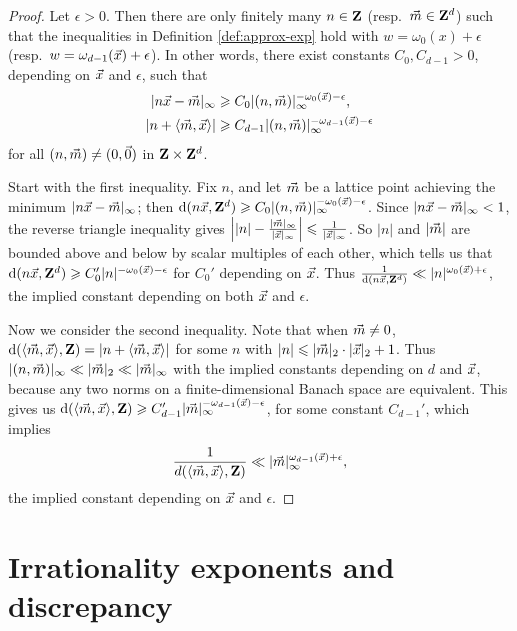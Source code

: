 \begin{proof}
Let $\epsilon>0$. Then there are only finitely many $n\in \mathbf{Z}$ 
(resp.~$\vec{m}\in \mathbf{Z}^d$) such that the inequalities in Definition 
\ref{def:approx-exp} hold with $w = \omega_0(x)+\epsilon$ 
(resp.~$w = \omega_{d-1}(\vec{x})+\epsilon$). In other words, there exist constants 
$C_0, C_{d-1}>0$, depending on $\vec{x}$ and $\epsilon$, such that 
\begin{align*}
	|n \vec{x} - \vec{m}|_\infty 
		&\geqslant C_0 |(n,\vec{m})|_\infty^{-\omega_0(\vec{x})-\epsilon} ,\\
	|n + \langle \vec{m},\vec{x}\rangle| 
		&\geqslant C_{d-1} |(n,\vec{m})|_\infty^{-\omega_{d-1}(\vec{x})-\epsilon} 
\end{align*}
for all $(n,\vec{m})\ne (0,\vec{0})$ in $\mathbf{Z}\times\mathbf{Z}^d$. 

Start with the first inequality. Fix $n$, and let $\vec{m}$ be a lattice point 
achieving the minimum $|n \vec{x} - \vec{m}|_\infty$; then 
$\mathrm{d}(n \vec{x},\mathbf{Z}^d) \geqslant C_0 |(n,\vec{m})|_\infty^{-\omega_0(\vec{x})-\epsilon}$. 
Since $|n\vec{x} - \vec{m}|_\infty < 1$, the reverse triangle inequality gives 
$\left| |n| - \frac{|\vec{m}|_\infty}{|\vec{x}|_\infty}\right| \leqslant \frac{1}{|\vec{x}|_\infty}$. So $|n|$ and $|\vec{m}|$ are bounded above and below by scalar multiples 
of each other, which tells us that 
$\mathrm{d}(n \vec{x},\mathbf{Z}^d) \geqslant C_0' |n|^{-\omega_0(\vec{x})-\epsilon}$ for $C_0'$ 
depending on $\vec{x}$. Thus 
$\frac{1}{\mathrm{d}(n \vec{x},\mathbf{Z}^d)} \ll |n|^{\omega_0(\vec{x})+\epsilon}$, the 
implied constant depending on both $\vec{x}$ and $\epsilon$.

Now we consider the second inequality. Note that when $\vec{m}\ne 0$, 
$\mathrm{d}(\langle \vec{m},\vec{x}\rangle,\mathbf{Z}) = |n + \langle \vec{m},\vec{x}\rangle|$ for 
some $n$ with $|n| \leqslant |\vec{m}|_2\cdot |\vec{x}|_2 + 1$. Thus 
$|(n,\vec{m})|_\infty \ll |\vec{m}|_2 \ll |\vec{m}|_\infty$ with the implied constants 
depending on $d$ and $\vec{x}$, because any two norms on a 
finite-dimensional Banach space are equivalent. This gives us 
$\mathrm{d}(\langle\vec{m},\vec{x}\rangle,\mathbf{Z}) \geqslant C_{d-1}' |\vec{m}|_\infty^{-\omega_{d-1}(\vec{x})-\epsilon}$, 
for some constant $C_{d-1}'$, which implies 
\[
	\frac{1}{d(\langle \vec{m},\vec{x}\rangle,\mathbf{Z})} \ll |\vec{m}|_\infty^{\omega_{d-1}(\vec{x})+\epsilon} ,
\]
the implied constant depending on $\vec{x}$ and $\epsilon$.
\end{proof}





\section{Irrationality exponents and discrepancy}

